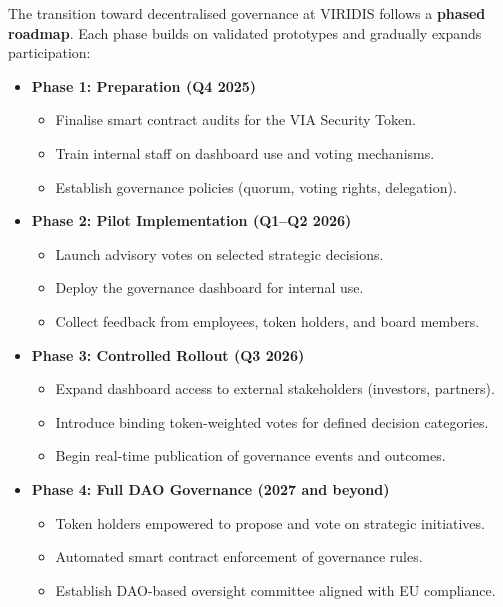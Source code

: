 \documentclass[
  english,
  12pt,
  oneside,
  open=any]{scrbook}
\providecommand{\tightlist}{%
  \setlength{\itemsep}{0pt}\setlength{\parskip}{0pt}}\usepackage{longtable,booktabs,array}
\begin{document}
The transition toward decentralised governance at VIRIDIS follows a
\textbf{phased roadmap}. Each phase builds on validated prototypes and
gradually expands participation:

\begin{itemize}
\tightlist
\item
  \textbf{Phase 1: Preparation (Q4 2025)}

  \begin{itemize}
  \tightlist
  \item
    Finalise smart contract audits for the VIA Security Token.\\
  \item
    Train internal staff on dashboard use and voting mechanisms.\\
  \item
    Establish governance policies (quorum, voting rights, delegation).
  \end{itemize}
\item
  \textbf{Phase 2: Pilot Implementation (Q1--Q2 2026)}

  \begin{itemize}
  \tightlist
  \item
    Launch advisory votes on selected strategic decisions.\\
  \item
    Deploy the governance dashboard for internal use.\\
  \item
    Collect feedback from employees, token holders, and board members.
  \end{itemize}
\item
  \textbf{Phase 3: Controlled Rollout (Q3 2026)}

  \begin{itemize}
  \tightlist
  \item
    Expand dashboard access to external stakeholders (investors,
    partners).\\
  \item
    Introduce binding token-weighted votes for defined decision
    categories.\\
  \item
    Begin real-time publication of governance events and outcomes.
  \end{itemize}
\item
  \textbf{Phase 4: Full DAO Governance (2027 and beyond)}

  \begin{itemize}
  \tightlist
  \item
    Token holders empowered to propose and vote on strategic
    initiatives.\\
  \item
    Automated smart contract enforcement of governance rules.\\
  \item
    Establish DAO-based oversight committee aligned with EU compliance.
  \end{itemize}
\end{itemize}
\end{document}
